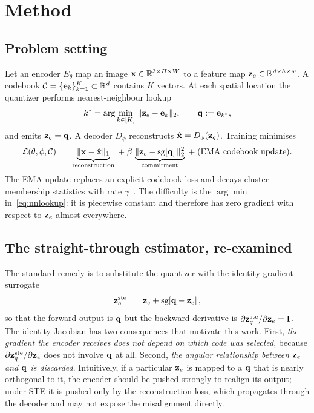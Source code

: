 \section{Method}
\label{sec:method}

\subsection{Problem setting}

Let an encoder $E_\theta$ map an image $\mathbf{x} \in \mathbb{R}^{3 \times H
\times W}$ to a feature map $\mathbf{z}_e \in \mathbb{R}^{d \times h \times w}$. A
codebook $\mathcal{C} = \{\mathbf{e}_k\}_{k=1}^{K} \subset \mathbb{R}^{d}$ contains
$K$ vectors. At each spatial location the quantizer performs
nearest-neighbour lookup
\begin{equation}
  k^* = \arg\min_{k \in [K]} \,\|\mathbf{z}_e - \mathbf{e}_k\|_2, \qquad
  \mathbf{q} := \mathbf{e}_{k^*},
  \label{eq:nnlookup}
\end{equation}
and emits $\mathbf{z}_q = \mathbf{q}$. A decoder $D_\phi$ reconstructs
$\hat{\mathbf{x}} = D_\phi(\mathbf{z}_q)$. Training minimises
\begin{equation}
  \mathcal{L}(\theta,\phi,\mathcal{C}) \;=\;
    \underbrace{\|\mathbf{x} - \hat{\mathbf{x}}\|_1}_{\text{reconstruction}} \;+\;
    \beta\,\underbrace{\|\mathbf{z}_e - \operatorname{sg}\!\left[\mathbf{q}\right]\|_2^2}_{\text{commitment}} \;+\;
    \text{(EMA codebook update)}.
  \label{eq:loss}
\end{equation}
The EMA update replaces an explicit codebook loss and decays
cluster-membership statistics with rate
$\gamma$~\citep{razavi2019vqvae2}. The difficulty is the $\arg\min$
in~\eqref{eq:nnlookup}: it is piecewise constant and therefore has
zero gradient with respect to $\mathbf{z}_e$ almost everywhere.

\subsection{The straight-through estimator, re-examined}

The standard remedy is to substitute the quantizer with the
identity-gradient surrogate
\begin{equation}
  \mathbf{z}_q^{\mathrm{ste}} \;=\; \mathbf{z}_e + \operatorname{sg}\!\left[\mathbf{q} - \mathbf{z}_e\right],
  \label{eq:ste}
\end{equation}
so that the forward output is $\mathbf{q}$ but the backward derivative is
$\partial \mathbf{z}_q^{\mathrm{ste}} / \partial \mathbf{z}_e = \mathbf{I}$. The
identity Jacobian has two consequences that motivate this work.
First, \emph{the gradient the encoder receives does not depend on
which code was selected}, because
$\partial \mathbf{z}_q^{\mathrm{ste}} / \partial \mathbf{z}_e$ does not involve $\mathbf{q}$
at all. Second, \emph{the angular relationship between $\mathbf{z}_e$ and
$\mathbf{q}$ is discarded}. Intuitively, if a particular $\mathbf{z}_e$ is mapped
to a $\mathbf{q}$ that is nearly orthogonal to it, the encoder should be
pushed strongly to realign its output; under STE it is pushed only by
the reconstruction loss, which propagates through the decoder and
may not expose the misalignment directly.

